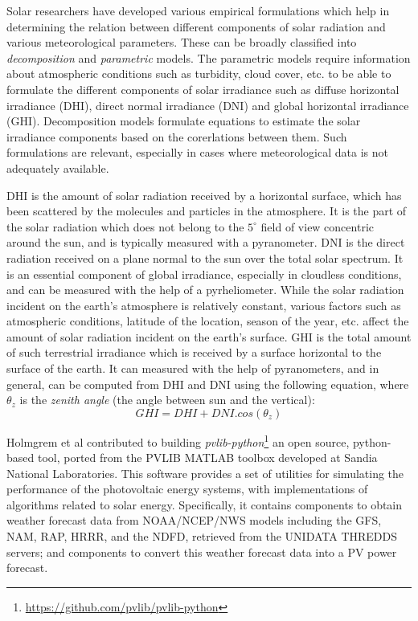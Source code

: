\par Solar researchers have developed various empirical formulations which help in determining the relation between different components of solar radiation and various meteorological parameters. These can be broadly classified into \textit{decomposition} and \textit{parametric} models. The parametric models require information about atmospheric conditions such as turbidity, cloud cover, etc. to be able to formulate the different components of solar irradiance such as diffuse horizontal irradiance (DHI), direct normal irradiance (DNI) and global horizontal irradiance (GHI). Decomposition models formulate equations to estimate the solar irradiance components based on the corerlations between them. Such formulations are relevant, especially in cases where meteorological data is not adequately available.

\par DHI is the amount of solar radiation received by a horizontal surface, which has been scattered by the molecules and particles in the atmosphere. It is the part of the solar radiation which does not belong to the $5^{\circ}$ field of view concentric around the sun, and is typically measured with a pyranometer. DNI is the direct radiation received on a plane normal to the sun over the total solar spectrum. It is an essential component of global irradiance, especially in cloudless conditions, and can be measured with the help of a pyrheliometer. While the solar radiation incident on the earth's atmosphere is relatively constant, various factors such as atmospheric conditions, latitude of the location, season of the year, etc. affect the amount of solar radiation incident on the earth's surface. GHI is the total amount of such terrestrial irradiance which is received by a surface horizontal to the surface of the earth. It can measured with the help of pyranometers, and in general, can be computed from DHI and DNI using the following equation, where $\theta_z$ is the \textit{zenith angle} (the angle between sun and the vertical):
\begin{equation}\label{eq:ghi}
    GHI = DHI + DNI . cos(\theta_z)
\end{equation}

\par Holmgrem et al \cite{pvlib_Holmgren2018} contributed to building \textit{pvlib-python}\footnote{\url{https://github.com/pvlib/pvlib-python}} an open source, python-based tool, ported from the PVLIB MATLAB toolbox developed at Sandia National Laboratories. This software provides a set of utilities for simulating the performance of the photovoltaic energy systems, with implementations of algorithms related to solar energy. Specifically, it contains components to obtain weather forecast data from NOAA/NCEP/NWS models including the GFS, NAM, RAP, HRRR, and the NDFD, retrieved from the UNIDATA THREDDS servers; and components to convert this weather forecast data into a PV power forecast. 

